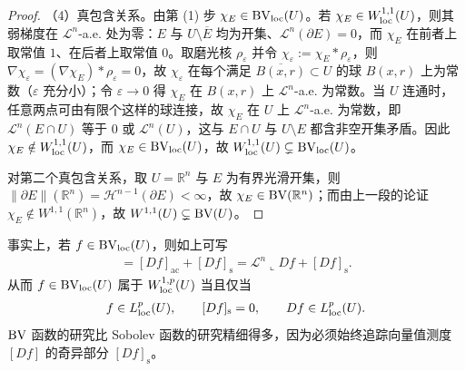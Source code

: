 \documentclass[../../main.tex]{subfiles}%
\begin{document}
\begin{proof}
（4）真包含关系。由第 (1) 步 $\chi_E\in\mathrm{BV}_{\mathrm{loc}}(U)$。若 $\chi_E\in W^{1,1}_{\mathrm{loc}}(U)$，则其弱梯度在 $\mathcal{L}^n$-a.e. 处为零：$E$ 与 $U\setminus\overline{E}$ 均为开集、$\mathcal{L}^n(\partial E)=0$，而 $\chi_E$ 在前者上取常值 $1$、在后者上取常值 $0$。取磨光核 $\rho_\varepsilon$ 并令 $\chi_\varepsilon:=\chi_E*\rho_\varepsilon$，则 $\nabla\chi_\varepsilon=(\nabla\chi_E)*\rho_\varepsilon=0$，故 $\chi_\varepsilon$ 在每个满足 $\overline{B(x,r)}\subset U$ 的球 $B(x,r)$ 上为常数（$\varepsilon$ 充分小）；令 $\varepsilon\to0$ 得 $\chi_E$ 在 $B(x,r)$ 上 $\mathcal{L}^n$-a.e. 为常数。当 $U$ 连通时，任意两点可由有限个这样的球连接，故 $\chi_E$ 在 $U$ 上 $\mathcal{L}^n$-a.e. 为常数，即 $\mathcal{L}^n(E\cap U)$ 等于 $0$ 或 $\mathcal{L}^n(U)$，这与 $E\cap U$ 与 $U\setminus E$ 都含非空开集矛盾。因此 $\chi_E\notin W^{1,1}_{\mathrm{loc}}(U)$，而 $\chi_E\in\mathrm{BV}_{\mathrm{loc}}(U)$，故 $W^{1,1}_{\mathrm{loc}}(U)\subsetneq\mathrm{BV}_{\mathrm{loc}}(U)$。

对第二个真包含关系，取 $U=\mathbb{R}^n$ 与 $E$ 为有界光滑开集，则 $\lVert\partial E\rVert(\mathbb{R}^n)=\mathcal{H}^{n-1}(\partial E)<\infty$，故 $\chi_E\in\mathrm{BV}(\mathbb{R}^n)$；而由上一段的论证 $\chi_E\notin W^{1,1}(\mathbb{R}^n)$，故 $W^{1,1}(U)\subsetneq\mathrm{BV}(U)$。
\end{proof}

\begin{remark}\label{remark:ch05-exa-5-1-奇异}
事实上，若 $f\in\mathrm{BV}_{\mathrm{loc}}(U)$，则如上可写
\begin{align*}
[Df]=[Df]_{\mathrm{ac}}+[Df]_{\mathrm{s}}=\mathcal{L}^n\llcorner Df+[Df]_{\mathrm{s}}.
\end{align*}
从而 $f\in\mathrm{BV}_{\mathrm{loc}}(U)$ 属于 $W^{1,p}_{\mathrm{loc}}(U)$ 当且仅当
\begin{align*}
f\in L^p_{\mathrm{loc}}(U),\qquad [Df]_{\mathrm{s}}=0,\qquad Df\in L^p_{\mathrm{loc}}(U).
\end{align*}
$\mathrm{BV}$ 函数的研究比 Sobolev 函数的研究精细得多，因为必须始终追踪向量值测度 $[Df]$ 的奇异部分 $[Df]_{\mathrm{s}}$。
\end{remark}
\end{document}
